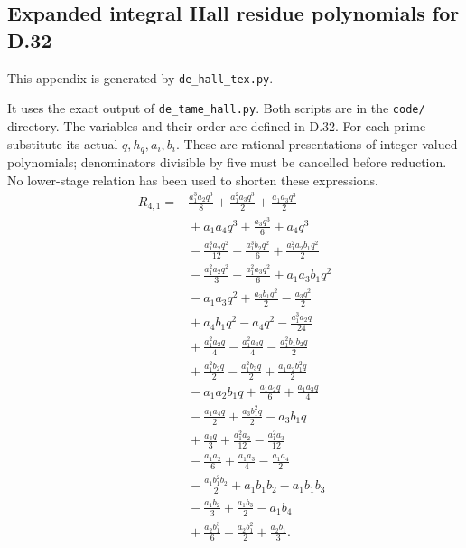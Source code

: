 \subsection*{Expanded integral Hall residue polynomials for D.32}
This appendix is generated by \texttt{de\_hall\_tex.py}.\par
It uses the exact output of \texttt{de\_tame\_hall.py}.
Both scripts are in the \texttt{code/} directory.
The variables and their order are defined in D.32.
For each prime substitute its actual $q,h_q,a_i,b_i$.
These are rational presentations of integer-valued polynomials;
denominators divisible by five must be cancelled before reduction.
No lower-stage relation has been used to shorten these expressions.
\begingroup\small\allowdisplaybreaks[4]
\begin{align*}
R_{4,1}={}& \frac{a_{1}^{3} a_{2} q^{3}}{8} + \frac{a_{1}^{2} a_{3} q^{3}}{2} + \frac{a_{1} a_{3} q^{3}}{2}\\
&{}+ a_{1} a_{4} q^{3} + \frac{a_{3} q^{3}}{6} + a_{4} q^{3}\\
&{}- \frac{a_{1}^{3} a_{2} q^{2}}{12} - \frac{a_{1}^{3} b_{2} q^{2}}{6} + \frac{a_{1}^{2} a_{2} b_{1} q^{2}}{2}\\
&{}- \frac{a_{1}^{2} a_{2} q^{2}}{3} - \frac{a_{1}^{2} a_{3} q^{2}}{6} + a_{1} a_{3} b_{1} q^{2}\\
&{}- a_{1} a_{3} q^{2} + \frac{a_{3} b_{1} q^{2}}{2} - \frac{a_{3} q^{2}}{2}\\
&{}+ a_{4} b_{1} q^{2} - a_{4} q^{2} - \frac{a_{1}^{3} a_{2} q}{24}\\
&{}+ \frac{a_{1}^{2} a_{2} q}{4} - \frac{a_{1}^{2} a_{3} q}{4} - \frac{a_{1}^{2} b_{1} b_{2} q}{2}\\
&{}+ \frac{a_{1}^{2} b_{2} q}{2} - \frac{a_{1}^{2} b_{3} q}{2} + \frac{a_{1} a_{2} b_{1}^{2} q}{2}\\
&{}- a_{1} a_{2} b_{1} q + \frac{a_{1} a_{2} q}{6} + \frac{a_{1} a_{3} q}{4}\\
&{}- \frac{a_{1} a_{4} q}{2} + \frac{a_{3} b_{1}^{2} q}{2} - a_{3} b_{1} q\\
&{}+ \frac{a_{3} q}{3} + \frac{a_{1}^{2} a_{2}}{12} - \frac{a_{1}^{2} a_{3}}{12}\\
&{}- \frac{a_{1} a_{2}}{6} + \frac{a_{1} a_{3}}{4} - \frac{a_{1} a_{4}}{2}\\
&{}- \frac{a_{1} b_{1}^{2} b_{2}}{2} + a_{1} b_{1} b_{2} - a_{1} b_{1} b_{3}\\
&{}- \frac{a_{1} b_{2}}{3} + \frac{a_{1} b_{3}}{2} - a_{1} b_{4}\\
&{}+ \frac{a_{2} b_{1}^{3}}{6} - \frac{a_{2} b_{1}^{2}}{2} + \frac{a_{2} b_{1}}{3}.
\end{align*}
